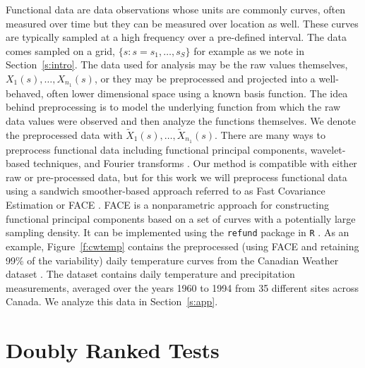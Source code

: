 \documentclass[12pt]{article}
\theoremstyle{plain}
\theoremstyle{remark}
\begin{document}
	Functional data are data observations whose units are commonly curves, often measured over time but they can be measured over location as well. These curves are typically sampled at a high frequency over a pre-defined interval. The data comes sampled on a grid, $\{s : s = s_1, \ldots, s_S\}$ for example as we note in Section~\ref{s:intro}. The data used for analysis may be the raw values themselves, $X_1(s), \ldots, X_{n_1}(s)$, or they may be preprocessed and projected into a well-behaved, often lower dimensional space using a known basis function. The idea behind preprocessing is to model the underlying function from which the raw data values were observed and then analyze the functions themselves. We denote the preprocessed data with $\tilde{X}_1(s), \ldots, \tilde{X}_{n_1}(s)$. There are many ways to preprocess functional data including functional principal components, wavelet-based techniques, and Fourier transforms \citep{Wang2016}. Our method is compatible with either raw or pre-processed data, but for this work we will preprocess functional data using a sandwich smoother-based approach referred to as Fast Covariance Estimation or FACE \citep{Xiao2013, Xiao2016}. FACE is a nonparametric approach for constructing functional principal components based on a set of curves with a potentially large sampling density. It can be implemented using the \texttt{refund} package in \texttt{R} \citep{Refund2022}. As an example, Figure~\ref{f:cwtemp} contains the preprocessed (using FACE and retaining 99\% of the variability) daily temperature curves from the Canadian Weather dataset \citep{Ramsay2005,Ramsay2009}. The dataset contains daily temperature and precipitation measurements, averaged over the years 1960 to 1994 from 35 different sites across Canada. We analyze this data in Section~\ref{s:app}.
	
	\section{Doubly Ranked Tests}
	\label{s:drts}
	
	
\end{document}
